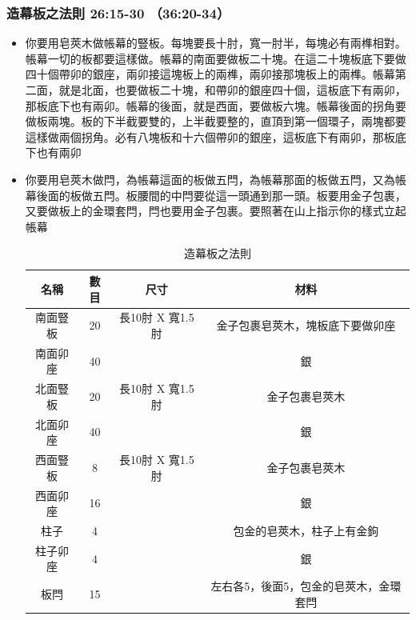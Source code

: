 \subsubsection{造幕板之法則 26:15-30 （36:20-34）}
\begin{itemize} 
\itemsep-.35em
\item 你要用皂莢木做帳幕的豎板。每塊要長十肘，寬一肘半，每塊必有兩榫相對。帳幕一切的板都要這樣做。帳幕的南面要做板二十塊。在這二十塊板底下要做四十個帶卯的銀座，兩卯接這塊板上的兩榫，兩卯接那塊板上的兩榫。帳幕第二面，就是北面，也要做板二十塊，和帶卯的銀座四十個，這板底下有兩卯，那板底下也有兩卯。帳幕的後面，就是西面，要做板六塊。帳幕後面的拐角要做板兩塊。板的下半截要雙的，上半截要整的，直頂到第一個環子，兩塊都要這樣做兩個拐角。必有八塊板和十六個帶卯的銀座，這板底下有兩卯，那板底下也有兩卯
\item 你要用皂莢木做閂，為帳幕這面的板做五閂，為帳幕那面的板做五閂，又為帳幕後面的板做五閂。板腰間的中閂要從這一頭通到那一頭。板要用金子包裹，又要做板上的金環套閂，閂也要用金子包裹。要照著在山上指示你的樣式立起帳幕
\begin{table}[H]
\centering
\begin{tabular}{|c|c|c|c| }
\hline
\hline
名稱   & 數目& 尺寸     & 材料  \\\hline
南面豎板&   20    &長10肘 X 寬1.5肘 &金子包裹皂莢木，塊板底下要做卯座\\\hline
南面卯座&  40    &                           &銀\\\hline
北面豎板&   20    &長10肘 X 寬1.5肘 &金子包裹皂莢木\\\hline
北面卯座&  40    &                           &銀\\\hline
西面豎板&   8    &長10肘 X 寬1.5肘 &金子包裹皂莢木\\\hline
西面卯座&  16    &                          &銀\\\hline
柱子&   4    &                                  &包金的皂莢木，柱子上有金鉤\\\hline
柱子卯座&  4    &  &銀\\\hline
板閂&  15    &  &左右各5，後面5，包金的皂莢木，金環套閂\\\hline
\end{tabular}
\caption{造幕板之法則}
\end{table}
\end{itemize}

